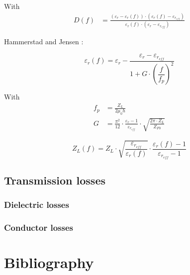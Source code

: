\documentclass[10pt]{report}
\begin{document}
With
\begin{align}
D(f) &= \frac{\left(\varepsilon_{r} - \varepsilon_{r}(f)\right)\cdot\left(\varepsilon_{r}(f) - \varepsilon_{r_{eff}}\right)}{\varepsilon_{r}(f)\cdot\left(\varepsilon_{r} - \varepsilon_{r_{eff}}\right)}
\end{align}

Hammerstad and Jensen \cite{Hammerstad}:

\begin{equation}
\varepsilon_{r}(f) = \varepsilon_{r} - \frac{\varepsilon_{r} - \varepsilon_{r_{eff}}}{1 + G\cdot \left(\dfrac{f}{f_{p}}\right)^{2}}
\end{equation}

With
\begin{align}
f_{p} &= \frac{Z_{L}}{2\mu_{0} h}\\
G &= \frac{\pi^{2}}{12}\cdot\frac{\varepsilon_{r} - 1}{\varepsilon_{r_{eff}}}\cdot\sqrt{\frac{2\pi\cdot Z_{L}}{Z_{F0}}}
\end{align}

\begin{equation}
Z_{L}(f) = Z_{L}\cdot\sqrt{\frac{\varepsilon_{r_{eff}}}{\varepsilon_{r}(f)}}\cdot\frac{\varepsilon_{r}(f) - 1}{\varepsilon_{r_{eff}} - 1}
\end{equation}


\section{Transmission losses}

\subsection{Dielectric losses}

\subsection{Conductor losses}

\nocite{*}

\chapter*{Bibliography}
\def\chapter*{}%
\def\section*{}%
\renewcommand{\bibname}{}


\end{document}
